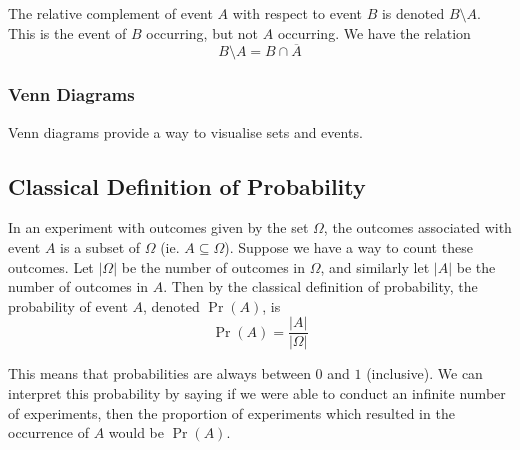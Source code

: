 \documentclass[11pt]{report} %
\begin{document}
The relative complement of event $A$ with respect to event $B$ is denoted $B\setminus A$. This is the event of $B$ occurring, but not $A$ occurring. We have the relation
\begin{equation}
B\setminus A = B\cap \overline{A}
\end{equation}

\subsubsection{Venn Diagrams}

Venn diagrams provide a way to visualise sets and events.

\begin{center}
\end{center}


\subsection{Classical Definition of Probability}

In an experiment with outcomes given by the set $\Omega$, the outcomes associated with event $A$ is a subset of $\Omega$ (ie. $A \subseteq \Omega$). Suppose we have a way to count these outcomes. Let $\left|\Omega\right|$ be the number of outcomes in $\Omega$, and similarly let $\left|A\right|$ be the number of outcomes in $A$. Then by the classical definition of probability, the probability of event $A$, denoted $\operatorname{Pr}\left(A\right)$, is
\begin{equation}
\operatorname{Pr}\left(A\right) = \dfrac{\left|A\right|}{\left|\Omega\right|}
\end{equation}

This means that probabilities are always between $0$ and $1$ (inclusive). We can interpret this probability by saying if we were able to conduct an infinite number of experiments, then the proportion of experiments which resulted in the occurrence of $A$ would be $\operatorname{Pr}\left(A\right)$.
\end{document}
